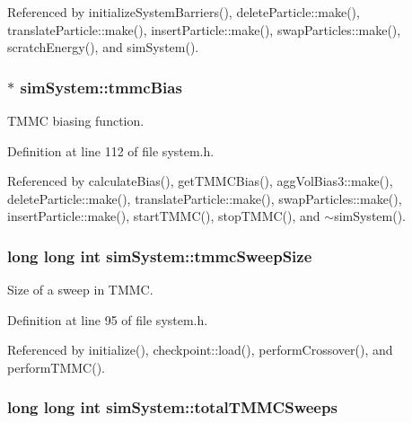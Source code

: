 Referenced by initialize\-System\-Barriers(), delete\-Particle\-::make(), translate\-Particle\-::make(), insert\-Particle\-::make(), swap\-Particles\-::make(), scratch\-Energy(), and sim\-System().

\hypertarget{classsim_system_a13173f45a1e40a5f5a3552b0ebe15b54}{
\subsubsection[{tmmc\-Bias}]{$\ast$ sim\-System\-::tmmc\-Bias}}\label{classsim_system_a13173f45a1e40a5f5a3552b0ebe15b54}


T\-M\-M\-C biasing function. 



Definition at line 112 of file system.\-h.



Referenced by calculate\-Bias(), get\-T\-M\-M\-C\-Bias(), agg\-Vol\-Bias3\-::make(), delete\-Particle\-::make(), translate\-Particle\-::make(), swap\-Particles\-::make(), insert\-Particle\-::make(), start\-T\-M\-M\-C(), stop\-T\-M\-M\-C(), and $\sim$sim\-System().

\hypertarget{classsim_system_a56e284a361964d0a9ce5c45f41d56ab1}{
\subsubsection[{tmmc\-Sweep\-Size}]{\setlength{\rightskip}{0pt plus 5cm}long long int sim\-System\-::tmmc\-Sweep\-Size}}\label{classsim_system_a56e284a361964d0a9ce5c45f41d56ab1}


Size of a sweep in T\-M\-M\-C. 



Definition at line 95 of file system.\-h.



Referenced by initialize(), checkpoint\-::load(), perform\-Crossover(), and perform\-T\-M\-M\-C().

\hypertarget{classsim_system_a78b107e20bcbf2f818264fa076de5db3}{
\subsubsection[{total\-T\-M\-M\-C\-Sweeps}]{\setlength{\rightskip}{0pt plus 5cm}long long int sim\-System\-::total\-T\-M\-M\-C\-Sweeps}}\label{classsim_system_a78b107e20bcbf2f818264fa076de5db3}


